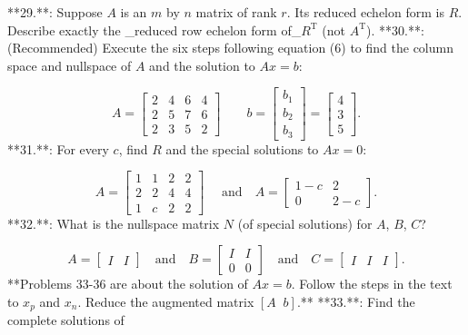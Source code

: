 

**29.**: Suppose \(A\) is an \(m\) by \(n\) matrix of rank \(r\). Its reduced echelon form is \(R\). Describe exactly the _reduced row echelon form of_\(R^{\mathrm{T}}\) (not \(A^{\mathrm{T}}\)).
**30.**: (Recommended) Execute the six steps following equation (6) to find the column space and nullspace of \(A\) and the solution to \(Ax=b\):

\[A=\begin{bmatrix}2&4&6&4\\ 2&5&7&6\\ 2&3&5&2\end{bmatrix}\qquad b=\begin{bmatrix}b_{1}\\ b_{2}\\ b_{3}\end{bmatrix}=\begin{bmatrix}4\\ 3\\ 5\end{bmatrix}.\]
**31.**: For every \(c\), find \(R\) and the special solutions to \(Ax=0\):

\[A=\begin{bmatrix}1&1&2&2\\ 2&2&4&4\\ 1&c&2&2\end{bmatrix}\quad\text{ and}\quad A=\begin{bmatrix}1-c&2\\ 0&2-c\end{bmatrix}.\]
**32.**: What is the nullspace matrix \(N\) (of special solutions) for \(A\), \(B\), \(C\)?

\[A=\begin{bmatrix}I&I\end{bmatrix}\quad\text{and}\quad B=\begin{bmatrix}I&I\\ 0&0\end{bmatrix}\quad\text{and}\quad C=\begin{bmatrix}I&I&I\end{bmatrix}.\]
**Problems 33-36 are about the solution of \(Ax=b\). Follow the steps in the text to \(x_{p}\) and \(x_{n}\). Reduce the augmented matrix \([A\;\;b]\).**
**33.**: Find the complete solutions of

